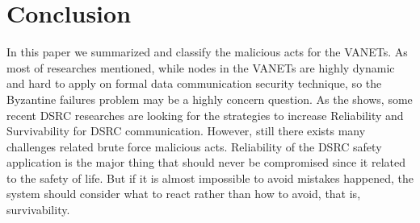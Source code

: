 \documentclass[conference]{IEEEtran}
\begin{document}
\section{Conclusion}
In this paper we summarized and classify the malicious acts for the VANETs. As most of researches mentioned, while nodes in the VANETs are highly dynamic and hard to apply on formal data communication security technique, so the Byzantine failures problem may be a highly concern question. As the \cite{Sta} shows, some recent DSRC researches are looking for the strategies to increase Reliability and Survivability for DSRC communication.  However, still there exists many challenges related brute force malicious acts. Reliability of the DSRC safety application is the major thing that should never be compromised since it related to the safety of life. But if it is almost impossible to avoid mistakes happened, the system should consider what to react rather than how to avoid, that is, survivability.  
\end{document}

